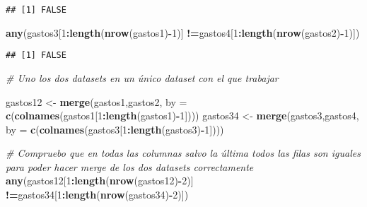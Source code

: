 \documentclass[notspecified,article,submit,moreauthors,pdftex]{Definitions/mdpi}
\newenvironment{Shaded}{\begin{snugshade}}{\end{snugshade}}
\newcommand{\AttributeTok}[1]{\textcolor[rgb]{0.13,0.29,0.53}{#1}}
\newcommand{\CommentTok}[1]{\textcolor[rgb]{0.56,0.35,0.01}{\textit{#1}}}
\newcommand{\DecValTok}[1]{\textcolor[rgb]{0.00,0.00,0.81}{#1}}
\newcommand{\FunctionTok}[1]{\textcolor[rgb]{0.13,0.29,0.53}{\textbf{#1}}}
\newcommand{\NormalTok}[1]{#1}
\newcommand{\OtherTok}[1]{\textcolor[rgb]{0.56,0.35,0.01}{#1}}
\newcommand{\SpecialCharTok}[1]{\textcolor[rgb]{0.81,0.36,0.00}{\textbf{#1}}}
\begin{document}
\begin{verbatim}
## [1] FALSE
\end{verbatim}

\begin{Shaded}
\begin{Highlighting}[]
\FunctionTok{any}\NormalTok{(gastos3[}\DecValTok{1}\SpecialCharTok{:}\FunctionTok{length}\NormalTok{(}\FunctionTok{nrow}\NormalTok{(gastos1)}\SpecialCharTok{{-}}\DecValTok{1}\NormalTok{)] }\SpecialCharTok{!=}\NormalTok{gastos4[}\DecValTok{1}\SpecialCharTok{:}\FunctionTok{length}\NormalTok{(}\FunctionTok{nrow}\NormalTok{(gastos2)}\SpecialCharTok{{-}}\DecValTok{1}\NormalTok{)])}
\end{Highlighting}
\end{Shaded}

\begin{verbatim}
## [1] FALSE
\end{verbatim}

\begin{Shaded}
\begin{Highlighting}[]
\CommentTok{\# Uno los dos datasets en un único dataset con el que trabajar}

\NormalTok{gastos12 }\OtherTok{\textless{}{-}} \FunctionTok{merge}\NormalTok{(gastos1,gastos2, }\AttributeTok{by =} \FunctionTok{c}\NormalTok{(}\FunctionTok{colnames}\NormalTok{(gastos1[}\DecValTok{1}\SpecialCharTok{:}\FunctionTok{length}\NormalTok{(gastos1)}\SpecialCharTok{{-}}\DecValTok{1}\NormalTok{])))}
\NormalTok{gastos34 }\OtherTok{\textless{}{-}} \FunctionTok{merge}\NormalTok{(gastos3,gastos4, }\AttributeTok{by =} \FunctionTok{c}\NormalTok{(}\FunctionTok{colnames}\NormalTok{(gastos3[}\DecValTok{1}\SpecialCharTok{:}\FunctionTok{length}\NormalTok{(gastos3)}\SpecialCharTok{{-}}\DecValTok{1}\NormalTok{])))}
\end{Highlighting}
\end{Shaded}

\begin{Shaded}
\begin{Highlighting}[]
\CommentTok{\# Compruebo que en todas las columnas salvo la última todos las filas son iguales para poder hacer merge de los dos datasets correctamente}
\FunctionTok{any}\NormalTok{(gastos12[}\DecValTok{1}\SpecialCharTok{:}\FunctionTok{length}\NormalTok{(}\FunctionTok{nrow}\NormalTok{(gastos12)}\SpecialCharTok{{-}}\DecValTok{2}\NormalTok{)] }\SpecialCharTok{!=}\NormalTok{gastos34[}\DecValTok{1}\SpecialCharTok{:}\FunctionTok{length}\NormalTok{(}\FunctionTok{nrow}\NormalTok{(gastos34)}\SpecialCharTok{{-}}\DecValTok{2}\NormalTok{)])}
\end{Highlighting}
\end{Shaded}
\end{document}
